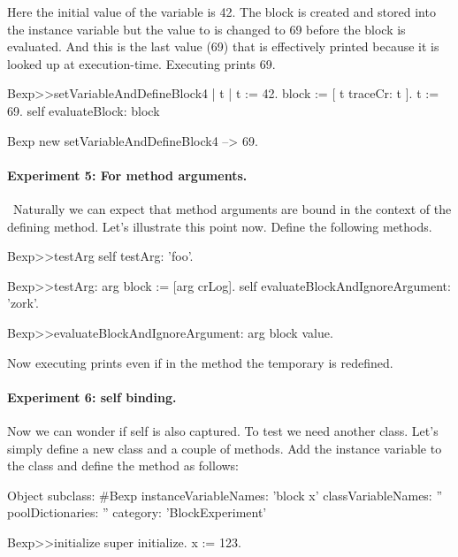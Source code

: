 \documentclass[a4paper,10pt,twoside]{book}
\begin{document}
Here the initial value of the variable  is 42. The block is created and stored into the instance variable  but the value to  is changed to 69 before the block is evaluated. And this is the last value (69) that is effectively printed because it is looked up at execution-time. Executing  prints 69.



\begin{code}{}
Bexp>>setVariableAndDefineBlock4
	| t |
	t := 42.
	block := [ t traceCr: t ].
	t := 69.
	self evaluateBlock: block

Bexp new setVariableAndDefineBlock4 
	--> 69.
\end{code}

\paragraph{Experiment 5: For method arguments.}\
Naturally we can expect that method arguments are bound in the context of the defining method. Let's illustrate this point now. Define the following methods.

\begin{code}{}
Bexp>>testArg
	self testArg: 'foo'.

Bexp>>testArg: arg
	block := [arg crLog].
	self evaluateBlockAndIgnoreArgument: 'zork'.

Bexp>>evaluateBlockAndIgnoreArgument: arg
	block value.
\end{code}

Now executing  prints  even if in the method  the temporary  is redefined.

\paragraph{Experiment 6: self binding.} Now we can wonder if self is also captured.
To test we need another class. Let's simply define a new class and a couple of methods.
Add the instance variable \ct{x} to the class \ct{Bexp} and define the \ct{initialize} method as follows:

\begin{code}{}
Object subclass: #Bexp
	instanceVariableNames: 'block x'
	classVariableNames: ''
	poolDictionaries: ''
	category: 'BlockExperiment'

Bexp>>initialize
    super initialize.
	x := 123.
\end{code}
\end{document}
